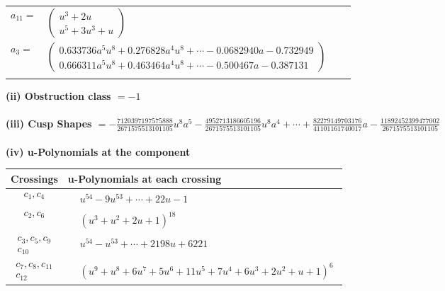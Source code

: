 \documentclass[1p]{elsarticle_modified}
\theoremstyle{definition}
\begin{document}
\begin{tabular}{m{7pt} m{180pt} m{7pt} m{180pt} }
\flushright $a_{11}=$&$\begin{pmatrix}u^3+2 u\\u^5+3 u^3+u\end{pmatrix}$ \\
\flushright $a_{3}=$&$\begin{pmatrix}0.633736 a^{5} u^{8}+0.276828 a^{4} u^{8}+\cdots-0.0682940 a-0.732949\\0.666311 a^{5} u^{8}+0.463464 a^{4} u^{8}+\cdots-0.500467 a-0.387131\end{pmatrix}$\\&\end{tabular}
\flushleft \textbf{(ii) Obstruction class $= -1$}\\~\\
\flushleft \textbf{(iii) Cusp Shapes $= -\frac{7120397197575888}{2671575513101105} u^8 a^5-\frac{4952713186605196}{2671575513101105} u^8 a^4+\cdots+\frac{82279149703176}{41101161740017} a-\frac{11892452399477002}{2671575513101105}$}\\~\\
\newpage\renewcommand{\arraystretch}{1}
\flushleft \textbf{(iv) u-Polynomials at the component}\newline \\
\begin{tabular}{m{50pt}|m{274pt}}
Crossings & \hspace{64pt}u-Polynomials at each crossing \\
\hline $$\begin{aligned}c_{1},c_{4}\end{aligned}$$&$\begin{aligned}
&u^{54}-9 u^{53}+\cdots+22 u-1
\end{aligned}$\\
\hline $$\begin{aligned}c_{2},c_{6}\end{aligned}$$&$\begin{aligned}
&(u^3+u^2+2 u+1)^{18}
\end{aligned}$\\
\hline $$\begin{aligned}c_{3},c_{5},c_{9}\\c_{10}\end{aligned}$$&$\begin{aligned}
&u^{54}- u^{53}+\cdots+2198 u+6221
\end{aligned}$\\
\hline $$\begin{aligned}c_{7},c_{8},c_{11}\\c_{12}\end{aligned}$$&$\begin{aligned}
&(u^9+u^8+6 u^7+5 u^6+11 u^5+7 u^4+6 u^3+2 u^2+u+1)^6
\end{aligned}$\\
\hline
\end{tabular}\\~\\
\end{document}
